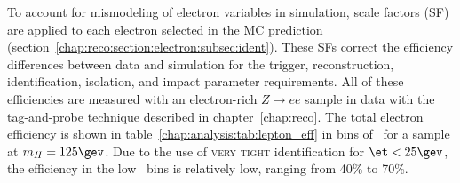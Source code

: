 \begin{table}[h]
\centering
\renewcommand{\arraystretch}{1.1}
\caption[Electron selection summary in \et~bins.]{Electron selection summary in
  \et~bins, including the identification category, the calorimeter and
track isolation cuts, and the impact parameter cuts.}
\label{chap:analysis:tab:electron_selection}
\end{table}

To account for mismodeling of electron variables in simulation,
scale factors (SF) are applied to each electron selected in the MC
prediction
(section~\ref{chap:reco:section:electron:subsec:ident}). These SFs
correct the efficiency differences between data and simulation for the
trigger, reconstruction, identification, isolation, and impact
parameter requirements. All of these efficiencies are measured with an
electron-rich $Z\rightarrow{ee}$ sample in data with the tag-and-probe
technique described in chapter~\ref{chap:reco}. The total electron
efficiency is shown in table~\ref{chap:analysis:tab:lepton_eff} in
bins of \et~for a \hww sample at $m_H = 125 \gev$. Due to the use of \textsc{very tight} identification for
$\et < 25 \gev$, the efficiency in the low \et~bins is relatively low,
ranging from 40\% to 70\%. 

